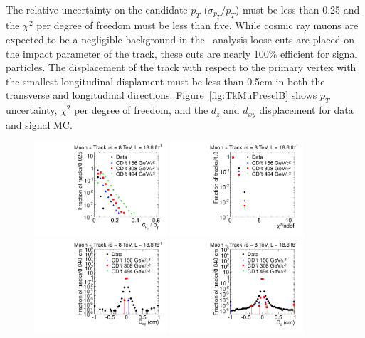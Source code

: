 The relative uncertainty on the candidate $p_T$ ($\sigma_{p_T}/p_T$) must be less than 0.25 and the $\chi^2$ per degree of freedom must be less than five.
While cosmic ray muons are expected to be a negligible background in the \tktof\ analysis loose cuts are placed on the impact parameter of the track, 
these cuts are nearly 100\% efficient for signal particles.
The displacement of the track with respect to the primary vertex
with the smallest longitudinal displament must be less than 0.5cm in both the transverse and longitudinal directions.
Figure~\ref{fig:TkMuPreselB} shows $p_T$ uncertainty, $\chi^2$ per degree of freedom, and the $d_z$ and $d_{xy}$ displacement for data and signal MC.

\begin{figure}
\centering
  \includegraphics[clip=true, trim=0.0cm 0cm 2.8cm 0cm, width=0.44\textwidth]{figures/tkmu/Selection_Comp_8TeV_GMStau_Pterr_BS}
  \includegraphics[clip=true, trim=0.0cm 0cm 2.8cm 0cm, width=0.44\textwidth]{figures/tkmu/Selection_Comp_8TeV_GMStau_Chi2_BS} \\
  \includegraphics[clip=true, trim=0.0cm 0cm 2.8cm 0cm, width=0.44\textwidth]{figures/tkmu/Selection_Comp_8TeV_GMStau_Dxy_BS}
  \includegraphics[clip=true, trim=0.0cm 0cm 2.8cm 0cm, width=0.44\textwidth]{figures/tkmu/Selection_Comp_8TeV_GMStau_Dz_BS}

\end{figure}
